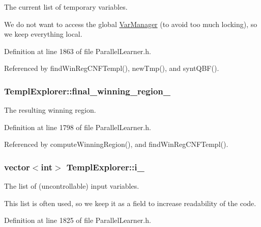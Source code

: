 The current list of temporary variables. 

We do not want to access the global \hyperlink{classVarManager}{Var\-Manager} (to avoid too much locking), so we keep everything local. 

Definition at line 1863 of file Parallel\-Learner.\-h.



Referenced by find\-Win\-Reg\-C\-N\-F\-Templ(), new\-Tmp(), and synt\-Q\-B\-F().

\hypertarget{classTemplExplorer_a0fc3d028e5dea077be40f039e559d3d8}{
\subsubsection[{final\-\_\-winning\-\_\-region\-\_\-}]{ Templ\-Explorer\-::final\-\_\-winning\-\_\-region\-\_\-\hspace{0.3cm}{\ttfamily [protected]}}}\label{classTemplExplorer_a0fc3d028e5dea077be40f039e559d3d8}


The resulting winning region. 



Definition at line 1798 of file Parallel\-Learner.\-h.



Referenced by compute\-Winning\-Region(), and find\-Win\-Reg\-C\-N\-F\-Templ().

\hypertarget{classTemplExplorer_ad04d957e4f909749c6aba0b31b877431}{
\subsubsection[{i\-\_\-}]{\setlength{\rightskip}{0pt plus 5cm}vector$<$int$>$ Templ\-Explorer\-::i\-\_\-\hspace{0.3cm}{\ttfamily [protected]}}}\label{classTemplExplorer_ad04d957e4f909749c6aba0b31b877431}


The list of (uncontrollable) input variables. 

This list is often used, so we keep it as a field to increase readability of the code. 

Definition at line 1825 of file Parallel\-Learner.\-h.



